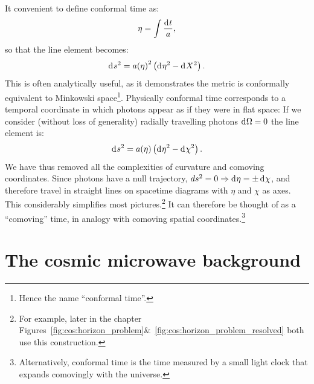 It convenient to define conformal time as:
\begin{equation}
  \eta = \int \frac{\operatorname{d}^{}\!{t}}{a},
  \label{eqn:cos:conformal_time}
\end{equation}
so that the line element becomes:
\begin{equation}          
  \operatorname{d}^{}\!{s}^2 = {a(\eta)}^2\left( \operatorname{d}^{}\!{\eta}^2 - \operatorname{d}^{}\!{X}^2 \right).
  \label{eqn:cos:flat_FRW}
\end{equation}
This is often analytically useful, as it demonstrates the metric is conformally equivalent to Minkowski space\footnote{Hence the name ``conformal time''.}. Physically conformal time corresponds to a temporal coordinate in which photons appear as if they were in flat space: If we consider (without loss of generality) radially travelling photons \(\operatorname{d}^{}\!{\Omega}=0\) the line element is:
\begin{equation}          
  \operatorname{d}^{}\!{s}^2 = a(\eta)\left( \operatorname{d}^{}\!{\eta}^2 - \operatorname{d}^{}\!{\chi}^2 \right).
  \label{eqn:cos:flat_FRW_radial}
\end{equation}
We have thus removed all the complexities of curvature and comoving coordinates. Since photons have a null trajectory, \(ds^2=0\Rightarrow \operatorname{d}^{}\!{\eta} = \pm \operatorname{d}^{}\!{\chi}\), and therefore  travel in straight lines on spacetime diagrams with \(\eta\) and \(\chi\) as axes. This considerably simplifies most pictures.\footnote{For example, later in the chapter Figures~\protect\ref{fig:cos:horizon_problem}\&~\protect\ref{fig:cos:horizon_problem_resolved} both use this construction.}  It can therefore be thought of as a ``comoving'' time, in analogy with comoving spatial coordinates.\footnote{Alternatively, conformal time is the time measured by a small light clock that expands comovingly with the universe.}

\section{The cosmic microwave background}

